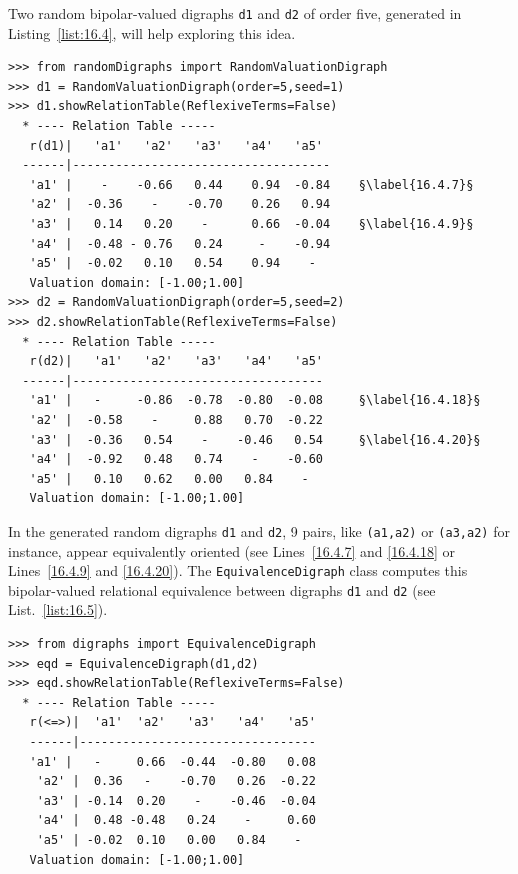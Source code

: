 Two random bipolar-valued digraphs \texttt{d1} and \texttt{d2} of order five, generated in Listing~\vref{list:16.4}, will help exploring this idea.
\begin{lstlisting}[caption={Two random bipolar-valued digraphs},label=list:16.4]
>>> from randomDigraphs import RandomValuationDigraph
>>> d1 = RandomValuationDigraph(order=5,seed=1)
>>> d1.showRelationTable(ReflexiveTerms=False)
  * ---- Relation Table -----
   r(d1)|   'a1'   'a2'   'a3'   'a4'   'a5'	  
  ------|------------------------------------
   'a1' |    - 	  -0.66	  0.44	  0.94	-0.84	 §\label{16.4.7}§
   'a2' |  -0.36    - 	 -0.70	  0.26	 0.94	 
   'a3' |   0.14   0.20	   - 	  0.66	-0.04	 §\label{16.4.9}§
   'a4' |  -0.48 - 0.76	  0.24	   -  	-0.94	 
   'a5' |  -0.02   0.10	  0.54	  0.94    - 	 
   Valuation domain: [-1.00;1.00]
>>> d2 = RandomValuationDigraph(order=5,seed=2)
>>> d2.showRelationTable(ReflexiveTerms=False)
  * ---- Relation Table -----
   r(d2)|   'a1'   'a2'   'a3'   'a4'   'a5'	  
  ------|-----------------------------------
   'a1' |   -     -0.86  -0.78  -0.80  -0.08	 §\label{16.4.18}§
   'a2' |  -0.58    -     0.88   0.70  -0.22	 
   'a3' |  -0.36   0.54    -    -0.46   0.54	 §\label{16.4.20}§ 
   'a4' |  -0.92   0.48   0.74    -    -0.60	 
   'a5' |   0.10   0.62   0.00   0.84    - 	 
   Valuation domain: [-1.00;1.00]
\end{lstlisting}

In the generated random digraphs \texttt{d1} and \texttt{d2}, 9 pairs, like \texttt{(a1,a2)} or \texttt{(a3,a2)} for instance, appear equivalently oriented (see Lines~\ref{16.4.7} and \ref{16.4.18} or Lines~\ref{16.4.9} and \ref{16.4.20}). The \texttt{Equiva\-lenceDigraph} class computes this bipolar-valued relational equivalence between digraphs \texttt{d1} and \texttt{d2} (see List.~\vref{list:16.5}).
\begin{lstlisting}[caption={Bipolar-valued Equivalence Digraph},label=list:16.5]
>>> from digraphs import EquivalenceDigraph
>>> eqd = EquivalenceDigraph(d1,d2)
>>> eqd.showRelationTable(ReflexiveTerms=False)
  * ---- Relation Table -----
   r(<=>)|  'a1'  'a2'   'a3'   'a4'   'a5'	  
   ------|---------------------------------
   'a1' |   - 	  0.66  -0.44  -0.80   0.08	 
    'a2' |  0.36   -    -0.70   0.26  -0.22	 
    'a3' | -0.14  0.20    -    -0.46  -0.04	 
    'a4' |  0.48 -0.48   0.24    -     0.60	 
    'a5' | -0.02  0.10   0.00   0.84    - 	 
   Valuation domain: [-1.00;1.00]
\end{lstlisting}

